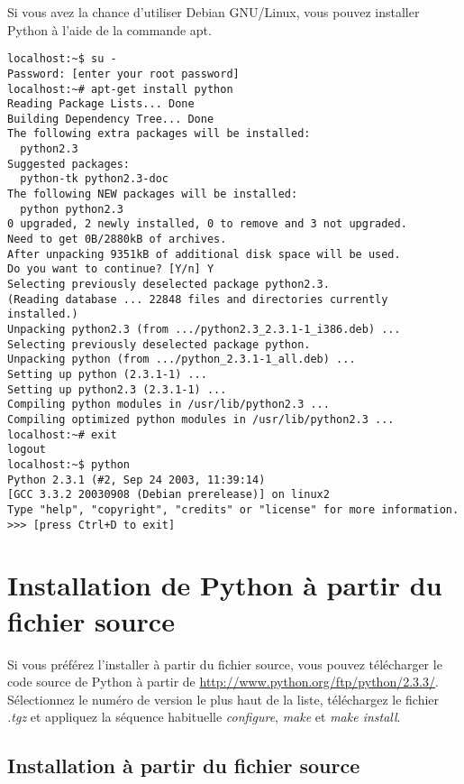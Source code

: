 Si vous avez la chance d'utiliser Debian GNU/Linux, vous pouvez installer Python à l'aide de la commande apt.

\begin{example}
\begin{lstlisting}[style=none]
localhost:~$ su -
Password: [enter your root password]
localhost:~# apt-get install python
Reading Package Lists... Done
Building Dependency Tree... Done
The following extra packages will be installed:
  python2.3
Suggested packages:
  python-tk python2.3-doc
The following NEW packages will be installed:
  python python2.3
0 upgraded, 2 newly installed, 0 to remove and 3 not upgraded.
Need to get 0B/2880kB of archives.
After unpacking 9351kB of additional disk space will be used.
Do you want to continue? [Y/n] Y
Selecting previously deselected package python2.3.
(Reading database ... 22848 files and directories currently installed.)
Unpacking python2.3 (from .../python2.3_2.3.1-1_i386.deb) ...
Selecting previously deselected package python.
Unpacking python (from .../python_2.3.1-1_all.deb) ...
Setting up python (2.3.1-1) ...
Setting up python2.3 (2.3.1-1) ...
Compiling python modules in /usr/lib/python2.3 ...
Compiling optimized python modules in /usr/lib/python2.3 ...
localhost:~# exit
logout
localhost:~$ python
Python 2.3.1 (#2, Sep 24 2003, 11:39:14)
[GCC 3.3.2 20030908 (Debian prerelease)] on linux2
Type "help", "copyright", "credits" or "license" for more information.
>>> [press Ctrl+D to exit]
\end{lstlisting}
\end{example}

\section{Installation de Python à partir du fichier source}\label{Installation de Python à partir du fichier source}

Si vous préférez l'installer à partir du fichier source, vous pouvez télécharger le code source de Python à partir de \url{http://www.python.org/ftp/python/2.3.3/}. Sélectionnez le numéro de version le plus haut de la liste, téléchargez le fichier \emph{.tgz} et appliquez la séquence habituelle \emph{configure}, \emph{make} et \emph{make install}.

\subsection*{Installation à partir du fichier source}

